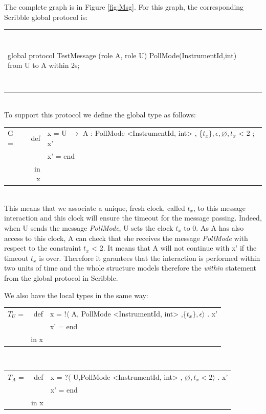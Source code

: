 \documentclass[a4paper,11pt,twoside]{report}
\begin{document}
\begin{center}
\end{center}

The complete graph is in Figure \ref{fig:Msg}.
For this graph, the corresponding Scribble global protocol is:\\
\begin{tabular}{ll}
~&~\\
\begin{SJLISTING}
global protocol TestMessage (role A, role U) {
	PollMode(InstrumentId,int) from U to A within 2s;
}
\end{SJLISTING}
&\\
~&~\\
\end{tabular}\\
To support this protocol we define the global type as follows:\\
\begin{tabular}{lrl}
G = & def & x = U $\rightarrow$ A : PollMode <InstrumentId, int> , \{$t_{x}\}, \epsilon, \varnothing, t_{x}$ < 2  ;  x’\\
&& x’ = end\\
& in x&\\
\end{tabular}\\
This means that we associate a unique, fresh clock, called $t_x$, to this message interaction and this clock will ensure the timeout for the message passing. Indeed, when U sends the message \emph{PollMode}, U sets the clock $t_x$ to 0. As A has also access to this clock, A can check that she receives the message \emph{PollMode} with respect to the constraint $t_x$ < 2. It means that A will not continue with x' if the timeout $t_{x}$ is over. Therefore it garantees that the interaction is performed within two units of time and the whole structure models therefore the \emph{within} statement from the global protocol in Scribble.

We also have the local types in the same way:\\
\begin{tabular}{lrl}
$T_{U}$ = & def &  x  = !$\langle$ A, PollMode <InstrumentId, int>  ,\{$t_{x}\},\epsilon \rangle$ . x’\\
&& x’ = end\\
& in x&\\
\end{tabular}\\
\begin{tabular}{lrl}
$T_{A}$ = & def &  x  = ?$\langle$ U,PollMode <InstrumentId, int>  , $\varnothing, t_{x} < 2 \rangle$ . x’\\
&& x’ = end\\
& in x&\\
\end{tabular}\\
\end{document}
